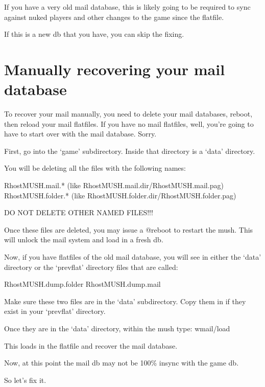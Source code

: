 \documentclass[letterpaper,10pt,english]{sphinxmanual}
\begin{document}
\sphinxAtStartPar
If you have a very old mail database, this is likely going to be required
to sync against nuked players and other changes to the game since the flatfile.

\sphinxAtStartPar
If this is a new db that you have, you can skip the fixing.


\section{Manually recovering your mail database}
\label{\detokenize{28-maildbcorrupt:manually-recovering-your-mail-database}}
\sphinxAtStartPar
To recover your mail manually, you need to delete your mail databases,
reboot, then reload your mail flatfiles.  If you have no mail flatfiles,
well, you’re going to have to start over with the mail database.  Sorry.

\sphinxAtStartPar
First, go into the ‘game’ subdirectory.  Inside that directory is a ‘data’
directory.

\sphinxAtStartPar
You will be deleting all the files with the following names:

\sphinxAtStartPar
RhostMUSH.mail.*                (like RhostMUSH.mail.dir/RhostMUSH.mail.pag)
RhostMUSH.folder.*              (like RhostMUSH.folder.dir/RhostMUSH.folder.pag)

\sphinxAtStartPar
DO NOT DELETE OTHER NAMED FILES!!!

\sphinxAtStartPar
Once these files are deleted, you may issue a @reboot to restart the mush.
This will unlock the mail system and load in a fresh db.

\sphinxAtStartPar
Now, if you have flatfiles of the old mail database, you will see in either
the ‘data’ directory or the ‘prevflat’ directory files that are called:

\sphinxAtStartPar
RhostMUSH.dump.folder
RhostMUSH.dump.mail

\sphinxAtStartPar
Make sure these two files are in the ‘data’ subdirectory.  Copy them in
if they exist in your ‘prevflat’ directory.

\sphinxAtStartPar
Once they are in the ‘data’ directory, within the mush type: wmail/load

\sphinxAtStartPar
This loads in the flatfile and recover the mail database.

\sphinxAtStartPar
Now, at this point the mail db may not be 100\% in\sphinxhyphen{}sync with the game db.

\sphinxAtStartPar
So let’s fix it.
\end{document}
